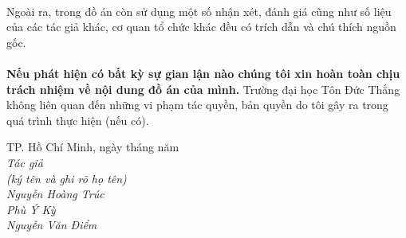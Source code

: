 \documentclass{article}
\begin{document}
	\paragraph{}
	Ngoài ra, trong đồ án còn sử dụng một số nhận xét, đánh giá cũng như số liệu của các tác giả khác, cơ quan tổ chức khác đều có trích dẫn và chú thích nguồn gốc.
	\paragraph{}
	\textbf{Nếu phát hiện có bất kỳ sự gian lận nào chúng tôi xin hoàn toàn chịu trách nhiệm về nội dung đồ án của mình.} Trường đại học Tôn Đức Thắng không liên quan đến những vi phạm tác quyền, bản quyền do tôi gây ra trong quá trình thực hiện (nếu có).
\begin{flushright}
	TP. Hồ Chí Minh,  ngày   tháng   năm   \\ 
	\textit{Tác giả\\
	(ký tên và ghi rõ họ tên)\\
	\vspace{1.5cm}
	Nguyễn Hoàng Trúc\\
	\vspace{1.5cm}
	Phù Ý Kỳ\\
	\vspace{1.5cm}
	Nguyễn Văn Điểm\\}
\end{flushright}
\pagebreak
\end{document}
